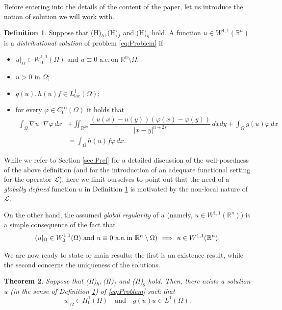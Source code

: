 \documentclass[11pt,a4paper]{amsart}
\def \R {\mathbb{R}}
\def \LL {\mathcal{L}}
\theoremstyle{definition}
\newtheorem{definition}{Definition}[section]
\theoremstyle{plain}
\newtheorem{theorem}[definition]{Theorem}
\numberwithin{equation}{section}
\begin{document}
Before entering into the details of the content of the paper, let us introduce the notion of solution we will work with. 
\begin{definition}\label{def:Distributional_Solution}
Suppose that (H)$_h$,\,(H)$_f$ and (H)$_g$ hold. A function $u \in W^{1,1}(\mathbb{R}^n)$ is a \emph{distributional solution} of problem \eqref{eq:Problem} if\begin{itemize}
\item[i)] $u|_\Omega\in W_0^{1,1}(\Omega)$ and $u\equiv 0$ a.e.\,on $\mathbb{R}^n\setminus\Omega$;
\item[ii)] $u>0$ in $\Omega$;
\vspace{0.1cm}

\item[iii)] $g(u), h(u)f\in L^{1}_{\mathrm{loc}}(\Omega)$;
\vspace{0.1cm}

\item[iv)] for every $\varphi \in C^{\infty}_{0}(\Omega)$ it holds that
\begin{equation} \label{eq:defDistributionalSolByParts}
\begin{aligned}
\int_{\Omega}\nabla u \cdot \nabla \varphi \, dx &+ \iint_{\mathbb{R}^{2n}}\dfrac{(u(x)-u(y))(\varphi(x)-\varphi(y))}{|x-y|^{n+2s}}\, dx dy + \int_{\Omega}g(u)\varphi \, dx \\
&= \int_{\Omega}h(u)f \varphi\, dx.
\end{aligned}
\end{equation}
\end{itemize}
\end{definition}
While we refer to Section \ref{sec.Prel} for a detailed discussion of the well-posedness of the above definition (and for the introduction of an adequate functional setting for the operator $\LL$), here we limit ourselves to point out that the need of a \emph{globally defined} fun\-ction 
$u$ in Definition \ref{def:Distributional_Solution} is motivated by the non-local nature of $\LL$.

On the other hand, the assumed \emph{global regularity} of $u$  
(namely, $u\in W^{1,1}(\mathbb{R}^n)$) is a simple consequence of the fact that 
$$\text{($u|_\Omega\in W_0^{1,1}(\Omega)$ and $u\equiv 0$ a.e.\,in $\R^n\setminus\Omega$})\,\,\Longrightarrow\,\,u\in W^{1,1}(\mathbb{R}^n).$$

 We are now ready to state or main results: the first is an existence result, while the second concerns the uniqueness of the solutions.\begin{theorem}\label{thm:Existence}
Suppose that \emph{(H)}$_h$,\,\emph{(H)}$_f$ and \emph{(H)}$_g$ hold. Then, there exists a solu\-tion $u$ \emph{(}in the sense of Definition \ref{def:Distributional_Solution}\emph{)} of \eqref{eq:Problem} such that
\begin{equation*}
u|_\Omega \in H_0^1(\Omega) \quad \textrm{and} \quad g(u)u\in L^{1}(\Omega).
\end{equation*}
\end{theorem}
\end{document}
